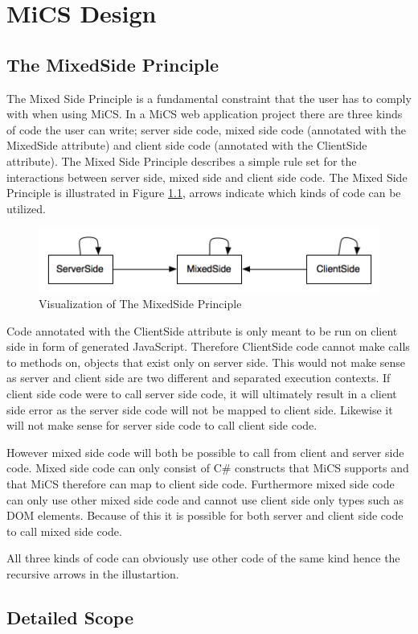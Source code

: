 \chapter{MiCS Design}

	\section{The MixedSide Principle} %
	\label{sub:the_mixedside_principle}
		The Mixed Side Principle is a fundamental constraint that the user has to comply with when using MiCS. In a MiCS web application project there are three kinds of code the user can write; server side code, mixed side code (annotated with the MixedSide attribute) and client side code (annotated with the ClientSide attribute). The Mixed Side Principle describes a simple rule set for the interactions between server side, mixed side and client side code. The Mixed Side Principle is illustrated in Figure \ref{fig:MixedSidePrinciple}, arrows indicate which kinds of code can be utilized.

		\begin{figure}[H]
			\begin{center}
				\centerline{\includegraphics[width=12cm]{resources/images/MixedSidePrinciple.png}}
			\end{center}
			\caption{Visualization of The MixedSide Principle}
			\label{fig:MixedSidePrinciple}
		\end{figure}

		Code annotated with the ClientSide attribute is only meant to be run on client side in form of generated JavaScript. Therefore ClientSide code cannot make calls to methods on, objects that exist only on server side. This would not make sense as server and client side are two different and separated execution contexts.  If client side code were to call server side code, it will ultimately result in a client side error as the server side code will not be mapped to client side. Likewise it will not make sense for server side code to call client side code.

		However mixed side code will both be possible to call from client and server side code. Mixed side code can only consist of C\# constructs that MiCS supports and that MiCS therefore can map to client side code. Furthermore mixed side code can only use other mixed side code and cannot use client side only types such as DOM elements. Because of this it is possible for both server and client side code to call mixed side code.

		All three kinds of code can obviously use other code of the same kind hence the recursive arrows in the illustartion.

		









\section{Detailed Scope}